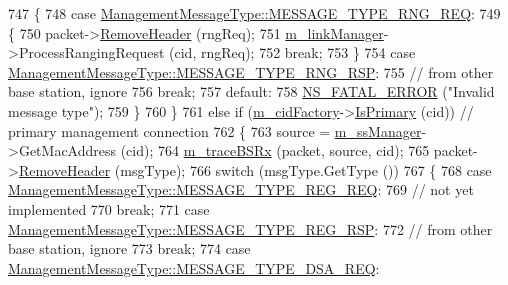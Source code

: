\begin{DoxyCode}
747             \{
748             \textcolor{keywordflow}{case} \hyperlink{classns3_1_1ManagementMessageType_a0e0c7a1e263538f0379d1bdb015abe3dacef47c5246aa3c32cee3ac10411734fe}{ManagementMessageType::MESSAGE\_TYPE\_RNG\_REQ}:
749               \{
750                 packet->\hyperlink{classns3_1_1Packet_a0961eccf975d75f902d40956c93ba63e}{RemoveHeader} (rngReq);
751                 \hyperlink{classns3_1_1BaseStationNetDevice_af69e5b5c16f3fe5d6549cfc21340b7fa}{m\_linkManager}->ProcessRangingRequest (cid, rngReq);
752                 \textcolor{keywordflow}{break};
753               \}
754             \textcolor{keywordflow}{case} \hyperlink{classns3_1_1ManagementMessageType_a0e0c7a1e263538f0379d1bdb015abe3dacc6d687507c639e29ca78b926d6345e1}{ManagementMessageType::MESSAGE\_TYPE\_RNG\_RSP}:
755               \textcolor{comment}{// from other base station, ignore}
756               \textcolor{keywordflow}{break};
757             \textcolor{keywordflow}{default}:
758               \hyperlink{group__fatal_ga5131d5e3f75d7d4cbfd706ac456fdc85}{NS\_FATAL\_ERROR} (\textcolor{stringliteral}{"Invalid message type"});
759             \}
760         \}
761       \textcolor{keywordflow}{else} \textcolor{keywordflow}{if} (\hyperlink{classns3_1_1BaseStationNetDevice_a40be478b4658b283435187caccba30ff}{m\_cidFactory}->\hyperlink{classns3_1_1CidFactory_a9ce2f9de01ae4bf9d782e043eef025db}{IsPrimary} (cid)) \textcolor{comment}{// primary management connection}
762         \{
763           source = \hyperlink{classns3_1_1BaseStationNetDevice_a2365fd053319dda930081e661e6381a6}{m\_ssManager}->GetMacAddress (cid);
764           \hyperlink{classns3_1_1BaseStationNetDevice_a0eb479748371aa4a19d45a57434020b8}{m\_traceBSRx} (packet, source, cid);
765           packet->\hyperlink{classns3_1_1Packet_a0961eccf975d75f902d40956c93ba63e}{RemoveHeader} (msgType);
766           \textcolor{keywordflow}{switch} (msgType.GetType ())
767             \{
768             \textcolor{keywordflow}{case} \hyperlink{classns3_1_1ManagementMessageType_a0e0c7a1e263538f0379d1bdb015abe3da828d55fda1b247a375efce7eec6f9539}{ManagementMessageType::MESSAGE\_TYPE\_REG\_REQ}:
769               \textcolor{comment}{// not yet implemented}
770               \textcolor{keywordflow}{break};
771             \textcolor{keywordflow}{case} \hyperlink{classns3_1_1ManagementMessageType_a0e0c7a1e263538f0379d1bdb015abe3da5579f363a6f117d318768de1f8e69e6f}{ManagementMessageType::MESSAGE\_TYPE\_REG\_RSP}:
772               \textcolor{comment}{// from other base station, ignore}
773               \textcolor{keywordflow}{break};
774             \textcolor{keywordflow}{case} \hyperlink{classns3_1_1ManagementMessageType_a0e0c7a1e263538f0379d1bdb015abe3da41f2a4c34e30fc87da1d91ee4d4a063b}{ManagementMessageType::MESSAGE\_TYPE\_DSA\_REQ}:

\end{DoxyCode}
